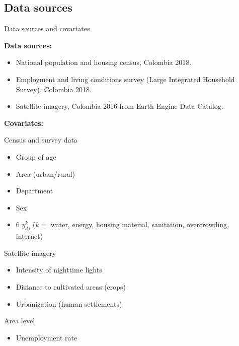 \documentclass [xcolor=svgnames, t, 9pt] {beamer}
\begin{document}


\subsection{Data sources}

\begin{frame}{Data sources and covariates}

\vspace{0.5cm}

\textbf{Data sources:}

\begin{itemize}
    \item National population and housing census, Colombia 2018.
    \item Employment and living conditions survey (Large Integrated Household Survey), Colombia 2018.
    \item Satellite imagery, Colombia 2016 from Earth Engine Data Catalog.
\end{itemize}


\vspace{0.5cm}

\pause 

\textbf{Covariates:}

\vspace{0.3cm}

\begin{minipage}[t]{0.45\textwidth}
Census and survey data
\begin{itemize}
\item Group of age
\item Area (urban/rural)
\item Department 
\item Sex
\item 6 $y^k_{dj}$ ($k=$ water, energy, housing material, sanitation, overcrowding, internet)
\end{itemize}
\end{minipage}
\begin{minipage}[t]{0.45\textwidth}
Satellite imagery 
\begin{itemize}
\item Intensity of nighttime lights 
\item Distance to cultivated areas (crops) 
\item Urbanization (human settlements)
\end{itemize}

\vspace{0.2cm}
Area level

\begin{itemize}
\item Unemployment rate 
\end{itemize}
\end{minipage}
\end{frame}
\end{document}
